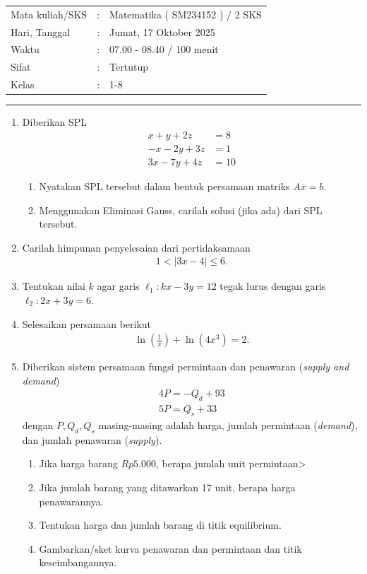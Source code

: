 \documentclass[10pt,openany,a4paper]{article}
\theoremstyle{definition}
\theoremstyle{definition}
\theoremstyle{plain}
\begin{document}
    \begin{center}
	\begin{tabular}{lcl}
		Mata kuliah/SKS & : & Matematika ( SM234152 ) / 2 SKS\\
		Hari, Tanggal & : & Jumat, 17 Oktober 2025\\
		Waktu & : & 07.00 - 08.40 / 100 menit\\
		Sifat & : & Tertutup\\
		Kelas & : & 1-8\
  ~
	\end{tabular}
    
    \noindent\rule{\textwidth}{2.pt}
        \end{center}
\begin{enumerate}
    \item Diberikan SPL 
    \begin{align*}
        x+y+2z &= 8\\
        -x-2y+3z &= 1\\
        3x-7y+4z &= 10
    \end{align*}
    \begin{enumerate}
        \item Nyatakan SPL tersebut dalam bentuk persamaan matriks $A\overline{x}=b$.
        \item Menggunakan Eliminasi Gauss, carilah solusi (jika ada) dari SPL tersebut.
    \end{enumerate}
    \item Carilah himpunan penyelesaian dari pertidaksamaan
    \begin{align*}
        1<|3x-4|\leq 6.
    \end{align*}
    \item Tentukan nilai $k$ agar garis $\ell_1:kx-3y=12$ tegak lurus dengan garis $\ell_2:2x+3y=6$.
    \item Selesaikan persamaan berikut 
    \begin{align*}
        \ln \left(\frac{1}{x}\right)+\ln(4x^3)=2.
    \end{align*}
    \item Diberikan sistem persamaan fungsi permintaan dan penawaran (\textit{supply and demand})
    \begin{align*}
       4P=-Q_d+93\\
       5P=Q_s+33
    \end{align*}
    dengan $P,Q_d,Q_s$ masing-masing adalah harga, jumlah permintaan (\textit{demand}), dan jumlah penawaran (\textit{supply}).
    \begin{enumerate}
        \item Jika harga barang $Rp5.000$, berapa jumlah unit permintaan>
        \item Jika jumlah barang yang ditawarkan 17 unit, berapa harga penawarannya.
        \item Tentukan harga dan jumlah barang di titik equilibrium.
        \item Gambarkan/sket kurva penawaran dan permintaan dan titik keseimbangannya.
    \end{enumerate}
\end{enumerate}
\newpage 


\end{document}
